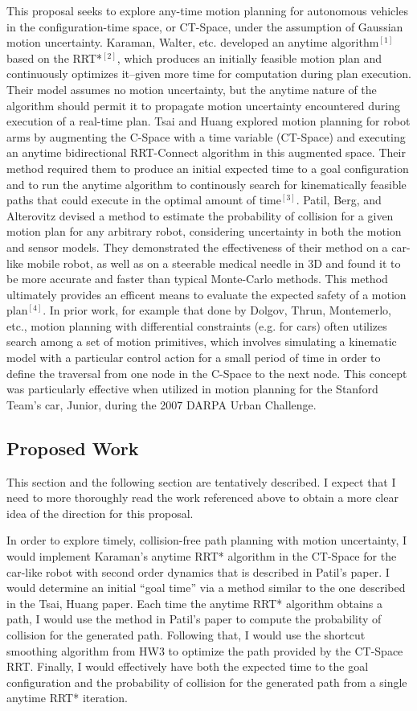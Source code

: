 \documentclass[12pt]{article}
\begin{document}
This proposal seeks to explore any-time motion planning for autonomous vehicles in the configuration-time space, or CT-Space, under the assumption of Gaussian motion uncertainty. Karaman, Walter, etc. developed an anytime algorithm$^{[1]}$ based on the RRT*$^{[2]}$, which produces an initially feasible motion plan and continuously optimizes it--given more time for computation during plan execution. Their model assumes no motion uncertainty, but the anytime nature of the algorithm should permit it to propagate motion uncertainty encountered during execution of a real-time plan. Tsai and Huang explored motion planning for robot arms by augmenting the C-Space with a time variable (CT-Space) and executing an anytime bidirectional RRT-Connect algorithm in this augmented space. Their method required them to produce an initial expected time to a goal configuration and to run the anytime algorithm to continously search for kinematically feasible paths that could execute in the optimal amount of time$^{[3]}$. Patil, Berg, and Alterovitz devised a method to estimate the probability of collision for a given motion plan for any arbitrary robot, considering uncertainty in both the motion and sensor models. They demonstrated the effectiveness of their method on a car-like mobile robot, as well as on a steerable medical needle in 3D and found it to be more accurate and faster than typical Monte-Carlo methods. This method ultimately provides an efficent means to evaluate the expected safety of a motion plan$^{[4]}$. In prior work, for example that done by Dolgov, Thrun, Montemerlo, etc., motion planning with differential constraints (e.g. for cars) often utilizes search among a set of motion primitives, which involves simulating a kinematic model with a particular control action for a small period of time in order to define the traversal from one node in the C-Space to the next node. This concept was particularly effective when utilized in motion planning for the Stanford Team's car, Junior, during the 2007 DARPA Urban Challenge.

\subsection*{Proposed Work}
This section and the following section are tentatively described. I expect that I need to more thoroughly read the work referenced above to obtain a more clear idea of the direction for this proposal.

In order to explore timely, collision-free path planning with motion uncertainty, I would implement Karaman's anytime RRT* algorithm in the CT-Space for the car-like robot with second order dynamics that is described in Patil's paper. I would determine an initial ``goal time'' via a method similar to the one described in the Tsai, Huang paper. Each time the anytime RRT* algorithm obtains a path, I would use the method in Patil's paper to compute the probability of collision for the generated path. Following that, I would use the shortcut smoothing algorithm from HW3 to optimize the path provided by the CT-Space RRT. Finally, I would effectively have both the expected time to the goal configuration and the probability of collision for the generated path from a single anytime RRT* iteration.
\end{document}
